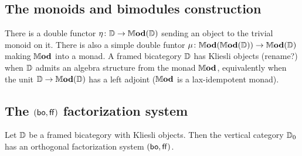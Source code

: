 \documentclass[12pt,oneside,article,draft]{memoir}
\begin{document}



\subsection{The monoids and bimodules construction}
There is a double functor $\eta\colon\mathbb{D}\to\mathbb{M}\mathbf{od}(\mathbb{D})$ sending an object to the trivial monoid on it. There is also a simple double funtor $\mu\colon\mathbb{M}\mathbf{od}(\mathbb{M}\mathbf{od}(\mathbb{D}))\to\mathbb{M}\mathbf{od}(\mathbb{D})$ making $\mathbb{M}\mathbf{od}$ into a monad.
A framed bicategory $\mathbb{D}$ has Kliesli objects (rename?) when $\mathbb{D}$ admits an algebra structure from the monad $\mathbb{M}\mathbf{od}$, equivalently when the unit $\mathbb{D}\to\mathbb{M}\mathbf{od}(\mathbb{D})$ has a left adjoint ($\mathbb{M}\mathbf{od}$ is a lax-idempotent monad).

\subsection{The $(\mathsf{bo},\mathsf{ff})$ factorization system}

\begin{theorem}
   Let $\mathbb{D}$ be a framed bicategory with Kliesli objects. Then the vertical category $\mathbb{D}_0$ has an orthogonal factorization system $(\mathsf{bo},\mathsf{ff})$.
\end{theorem}
\end{document}
